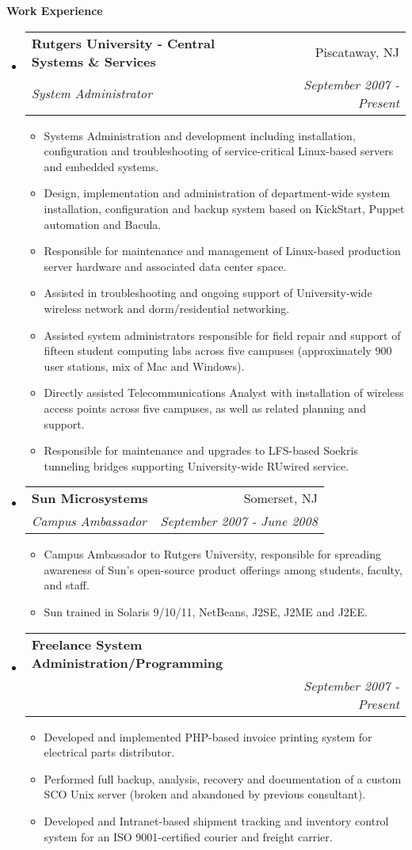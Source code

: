 \documentclass[letterpaper,11pt]{article}
\makeatletter
\newcommand{\resitem}[1]{\item #1 \vspace{-2pt}}
\newcommand{\resheading}[1]{{\large \colorbox{mygrey}{\begin{minipage}{\textwidth}{\textbf{#1 \vphantom{p\^{E}}}}\end{minipage}}}}
\newcommand{\ressubheading}[4]{
\begin{tabular*}{7.0in}{l@{\extracolsep{\fill}}r}
		\textbf{#1} & #2 \\
		\textit{#3} & \textit{#4} \\
\end{tabular*}\vspace{-6pt}}
\makeatother
\begin{document}
\resheading{Work Experience}
\begin{itemize}
\item
	\ressubheading{Rutgers University - Central Systems \&
          Services}{Piscataway, NJ}{System Administrator}{September 2007 - Present}
	\begin{itemize}
                \resitem{Systems Administration and development including
                  installation, configuration and troubleshooting of
                  service-critical Linux-based servers and embedded systems.}
                \resitem{Design, implementation and administration of department-wide system
                  installation, configuration and backup system based on
                  KickStart, Puppet automation and Bacula.}
                \resitem{Responsible for maintenance and management of
                  Linux-based production server hardware and associated data center space.}
                \resitem{Assisted in troubleshooting and ongoing support of
                  University-wide wireless network and dorm/residential networking.}
                \resitem{Assisted system administrators responsible for field
                  repair and support of fifteen student computing 
                  labs across five campuses (approximately 900 user stations,
                  mix of Mac and Windows).}
                \resitem{Directly assisted Telecommunications Analyst with
                  installation of wireless access
                  points across five campuses, as well as related planning and
                  support.}
                \resitem{Responsible for maintenance and upgrades to LFS-based
                  Soekris tunneling bridges supporting University-wide RUwired
                  service.}
	\end{itemize}

\item
        \ressubheading{Sun Microsystems}{Somerset, NJ}{Campus Ambassador}{September 2007 - June 2008}
        \begin{itemize}
                \resitem{Campus Ambassador to Rutgers University, responsible
                  for spreading awareness of Sun's open-source product
                  offerings among students, faculty, and staff.}
                \resitem{Sun trained in Solaris 9/10/11,
                  NetBeans, J2SE, J2ME and J2EE. }
        \end{itemize}

\item
        \ressubheading{Freelance System Administration/Programming}{ }{ }{September 2007 - Present}
        \begin{itemize}
               \resitem{Developed and implemented PHP-based invoice printing
                 system for electrical parts distributor.}
               \resitem{Performed full backup, analysis, recovery and documentation of a
                 custom SCO Unix server (broken and abandoned by previous consultant).}
               \resitem{Developed and Intranet-based shipment tracking and
                 inventory control system for an ISO 9001-certified courier
                 and freight carrier.}
        \end{itemize}


\end{itemize}
\end{document}
